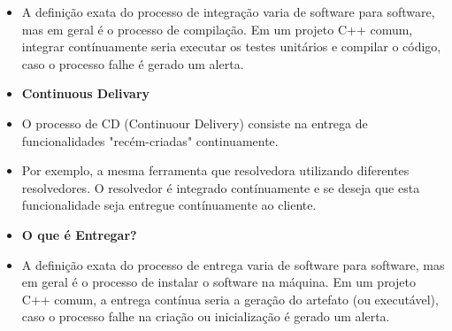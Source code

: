 \documentclass[10pt]{beamer}
\theoremstyle{remark}
\theoremstyle{definition}
\begin{document}
\begin{frame}[allowframebreaks]
\begin{itemize}
		\item A definição exata do processo de integração varia de software para software, mas em geral é o processo de compilação. Em um projeto C++ comum, integrar contínuamente seria executar os testes unitários e compilar o código, caso o processo falhe é gerado um alerta.
		
	\end{itemize}
	
	\framebreak
	
	\begin{itemize}
		\item \textbf{Continuous Delivary}
		
		\item O processo de CD (Continuour Delivery) consiste na entrega de funcionalidades "recém-criadas" continuamente.
		
		\item Por exemplo, a mesma ferramenta que resolvedora utilizando diferentes resolvedores. O resolvedor é integrado contínuamente e se deseja que esta funcionalidade seja entregue contínuamente ao cliente.
		
	\end{itemize}
	
	\framebreak
	
	\begin{itemize}
		\item \textbf{O que é Entregar?}
		
		\item A definição exata do processo de entrega varia de software para software, mas em geral é o processo de instalar o software na máquina. Em um projeto C++ comum, a entrega contínua seria a geração do artefato (ou executável), caso o processo falhe na criação ou inicialização é gerado um alerta.
		
	\end{itemize}
\end{frame}
\end{document}
